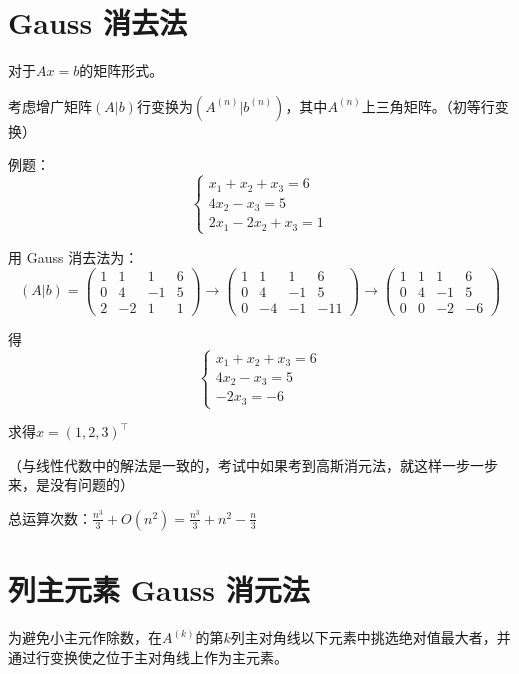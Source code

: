 \documentclass[UTF8,a4paper,11pt,oneside]{ctexbook}
\begin{document}
\section{Gauss 消去法}

对于\(Ax=b\)的矩阵形式。

考虑增广矩阵\((A|b)\)行变换为\((A^{(n)}|b^{(n)})\)，其中\(A^{(n)}\)上三角矩阵。（初等行变换）

例题：
\[
\begin{cases}
    x_1+x_2+x_3=6\\
    4x_2-x_3=5\\
    2x_1-2x_2+x_3=1
\end{cases}
\]

用 Gauss 消去法为：
\[
(A|b)=
\left(
\begin{array}{ccc|c}
    1 & 1 & 1 & 6\\
    0 & 4 & -1 & 5\\
    2 & -2 & 1 & 1 
\end{array}
\right)
\to
\left(
\begin{array}{ccc|c}
    1 & 1 & 1 & 6\\
    0 & 4 & -1 & 5\\
    0 & -4 & -1 & -11 
\end{array}
\right)
\to
\left(
\begin{array}{ccc|c}
    1 & 1 & 1 & 6\\
    0 & 4 & -1 & 5\\
    0 & 0 & -2 & -6 
\end{array}
\right)
\]

得
\[
\begin{cases}
    x_1+x_2+x_3=6\\
    4x_2-x_3=5\\
    -2x_3=-6
\end{cases}
\]

求得\(x=(1,2,3)^\top\)

（与线性代数中的解法是一致的，考试中如果考到高斯消元法，就这样一步一步来，是没有问题的）

总运算次数：\(\frac{n^3}{3}+O(n^2)=\frac{n^3}{3}+n^2-\frac{n}{3}\)

\section{列主元素 Gauss 消元法}

为避免小主元作除数，在\(A^{(k)}\)的第\(k\)列主对角线以下元素中挑选绝对值最大者，并通过行变换使之位于主对角线上作为主元素。
\end{document}
